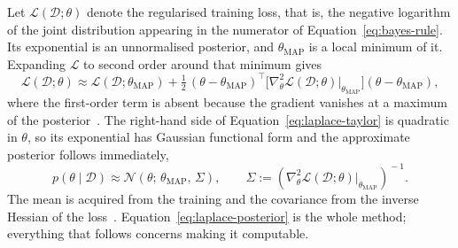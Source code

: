 Let $\mathcal{L}(\mathcal{D}; \theta)$ denote the regularised training loss, that
is, the negative logarithm of the joint distribution appearing in the numerator of Equation~\eqref{eq:bayes-rule}. Its exponential is an unnormalised posterior, and $\theta_{\mathrm{MAP}}$ is a local minimum of it. Expanding $\mathcal{L}$ to second order around that minimum gives
%
\begin{equation}
    \mathcal{L}(\mathcal{D}; \theta)
    \approx \mathcal{L}(\mathcal{D}; \theta_{\mathrm{MAP}})
      + \tfrac{1}{2}\,
        (\theta - \theta_{\mathrm{MAP}})^{\!\top}
        \bigl[
          \nabla^2_\theta \mathcal{L}(\mathcal{D}; \theta)
          \bigr|_{\theta_{\mathrm{MAP}}}
        \bigr]
        (\theta - \theta_{\mathrm{MAP}}) ,
    \label{eq:laplace-taylor}
\end{equation}
%
where the first-order term is absent because the gradient vanishes at a maximum of the posterior~\cite{ritter2018}. The right-hand side of Equation~\eqref{eq:laplace-taylor} is quadratic in $\theta$, so its exponential has Gaussian functional form and the approximate posterior follows immediately,
%
\begin{equation}
    p(\theta \mid \mathcal{D})
    \approx \mathcal{N}\!\left(\theta;\, \theta_{\mathrm{MAP}},\, \Sigma\right),
    \qquad
    \Sigma :=
    \left(
      \nabla^2_\theta \mathcal{L}(\mathcal{D}; \theta)
      \bigr|_{\theta_{\mathrm{MAP}}}
    \right)^{\!-1} .
    \label{eq:laplace-posterior}
\end{equation}
%
The mean is acquired from the training and the covariance from the inverse Hessian of the loss~\cite{jospin2022}. Equation~\eqref{eq:laplace-posterior} is the whole
method; everything that follows concerns making it computable.


